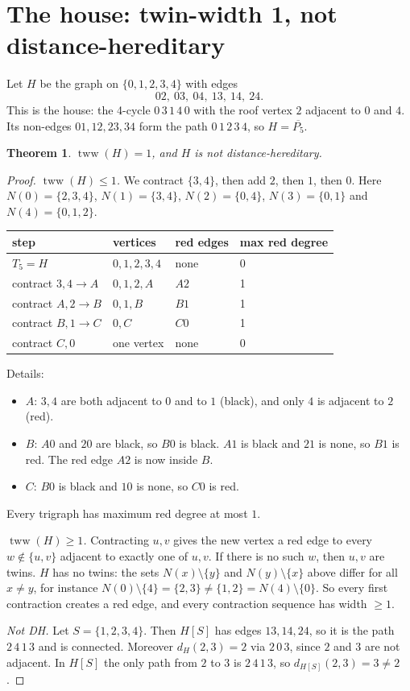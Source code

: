 \documentclass[11pt]{article}
\newtheorem{theorem}{Theorem}
\theoremstyle{definition}
\theoremstyle{remark}
\begin{document}
\section{The house: twin-width 1, not distance-hereditary}
Let $H$ be the graph on $\{0,1,2,3,4\}$ with edges
\[ 02,\ 03,\ 04,\ 13,\ 14,\ 24 . \]
This is the house: the 4-cycle $0\,3\,1\,4\,0$ with the roof vertex $2$ adjacent to
$0$ and $4$. Its non-edges $01,12,23,34$ form the path $0\,1\,2\,3\,4$, so
$H=\overline{P_5}$.

\begin{theorem}\label{thm:house}
$\operatorname{tww}(H)=1$, and $H$ is not distance-hereditary.
\end{theorem}

\begin{proof}
\emph{$\operatorname{tww}(H)\le1$.} We contract $\{3,4\}$, then add $2$, then $1$, then $0$.
Here $N(0)=\{2,3,4\}$, $N(1)=\{3,4\}$, $N(2)=\{0,4\}$, $N(3)=\{0,1\}$ and
$N(4)=\{0,1,2\}$.
\begin{center}
\begin{tabular}{llll}
\toprule
step & vertices & red edges & max red degree\\
\midrule
$T_5=H$ & $0,1,2,3,4$ & none & 0\\
contract $3,4\to A$ & $0,1,2,A$ & $A2$ & 1\\
contract $A,2\to B$ & $0,1,B$ & $B1$ & 1\\
contract $B,1\to C$ & $0,C$ & $C0$ & 1\\
contract $C,0$ & one vertex & none & 0\\
\bottomrule
\end{tabular}
\end{center}
Details:
\begin{itemize}
\item $A$: $3,4$ are both adjacent to $0$ and to $1$ (black), and only $4$ is adjacent to
$2$ (red).
\item $B$: $A0$ and $20$ are black, so $B0$ is black. $A1$ is black and $21$ is none,
so $B1$ is red. The red edge $A2$ is now inside $B$.
\item $C$: $B0$ is black and $10$ is none, so $C0$ is red.
\end{itemize}
Every trigraph has maximum red degree at most $1$.

\emph{$\operatorname{tww}(H)\ge1$.} Contracting $u,v$ gives the new vertex a red edge to
every $w\notin\{u,v\}$ adjacent to exactly one of $u,v$. If there is no such $w$, then
$u,v$ are twins. $H$ has no twins: the sets $N(x)\setminus\{y\}$ and
$N(y)\setminus\{x\}$ above differ for all $x\ne y$, for instance
$N(0)\setminus\{4\}=\{2,3\}\ne\{1,2\}=N(4)\setminus\{0\}$. So every first contraction
creates a red edge, and every contraction sequence has width $\ge1$.

\emph{Not DH.} Let $S=\{1,2,3,4\}$. Then $H[S]$ has edges $13,14,24$, so it is the
path $2\,4\,1\,3$ and is connected. Moreover $d_H(2,3)=2$ via $2\,0\,3$, since $2$ and $3$
are not adjacent. In $H[S]$ the only path from $2$ to $3$ is $2\,4\,1\,3$, so
$d_{H[S]}(2,3)=3\ne2$.
\end{proof}
\end{document}
